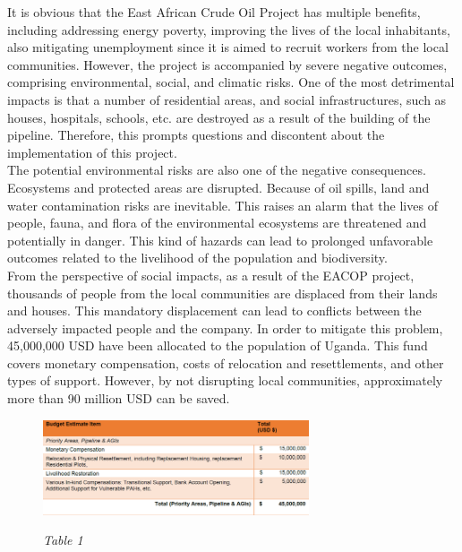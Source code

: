 \documentclass[12pt]{article}
\begin{document}
{\fontsize{12pt}{12pt}\selectfont  

\hspace*{1em}It is obvious that the East African Crude Oil Project has multiple benefits, including addressing energy poverty, improving the lives of the local inhabitants, also mitigating unemployment since it is aimed to recruit workers from the local communities. However, the project is accompanied by severe negative outcomes, comprising environmental, social, and climatic risks. One of the most detrimental impacts is that a number of residential areas, and social infrastructures, such as houses, hospitals, schools, etc. are destroyed as a result of the building of the pipeline. Therefore, this prompts questions and discontent about the implementation of this project.
\\

The potential environmental risks are also one of the negative consequences. Ecosystems and protected areas are disrupted. Because of oil spills, land and water contamination risks are inevitable. This raises an alarm that the lives of people, fauna, and flora of the environmental ecosystems are threatened and potentially in danger. This kind of hazards can lead to prolonged unfavorable outcomes related to the livelihood of the population and biodiversity.
\\

From the perspective of social impacts, as a result of the EACOP project, thousands of people from the local communities are displaced from their lands and houses. This mandatory displacement can lead to conflicts between the adversely impacted people and the company.  In order to mitigate this problem, 45,000,000 USD have been allocated to the population of Uganda. This fund covers monetary compensation, costs of relocation and resettlements, and other types of support. However, by not disrupting local communities, approximately more than 90 million USD can be saved.
\\


}


\begin{figure}[h!]
\begin{center}

	\centering
	\includegraphics[width=0.7\textwidth]{assets/images/table.png}
	
	\textit{Table 1}
\end{center}
	
\end{figure}
\end{document}
